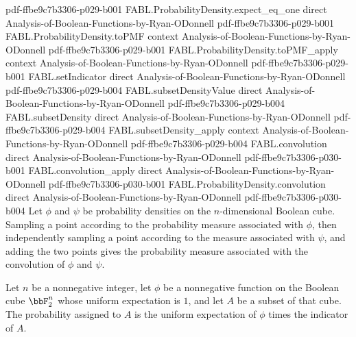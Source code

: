 \begin{theorem}
  {pdf-ffbe9c7b3306-p029-b001}
\proofstep
  {FABL.ProbabilityDensity.expect_eq_one}
  {direct}
  {Analysis-of-Boolean-Functions-by-Ryan-ODonnell}
  {pdf-ffbe9c7b3306-p029-b001}
\proofstep
  {FABL.ProbabilityDensity.toPMF}
  {context}
  {Analysis-of-Boolean-Functions-by-Ryan-ODonnell}
  {pdf-ffbe9c7b3306-p029-b001}
\proofstep
  {FABL.ProbabilityDensity.toPMF_apply}
  {context}
  {Analysis-of-Boolean-Functions-by-Ryan-ODonnell}
  {pdf-ffbe9c7b3306-p029-b001}
\proofstep
  {FABL.setIndicator}
  {direct}
  {Analysis-of-Boolean-Functions-by-Ryan-ODonnell}
  {pdf-ffbe9c7b3306-p029-b004}
\proofstep
  {FABL.subsetDensityValue}
  {direct}
  {Analysis-of-Boolean-Functions-by-Ryan-ODonnell}
  {pdf-ffbe9c7b3306-p029-b004}
\proofstep
  {FABL.subsetDensity}
  {direct}
  {Analysis-of-Boolean-Functions-by-Ryan-ODonnell}
  {pdf-ffbe9c7b3306-p029-b004}
\proofstep
  {FABL.subsetDensity_apply}
  {context}
  {Analysis-of-Boolean-Functions-by-Ryan-ODonnell}
  {pdf-ffbe9c7b3306-p029-b004}
\proofstep
  {FABL.convolution}
  {direct}
  {Analysis-of-Boolean-Functions-by-Ryan-ODonnell}
  {pdf-ffbe9c7b3306-p030-b001}
\proofstep
  {FABL.convolution_apply}
  {direct}
  {Analysis-of-Boolean-Functions-by-Ryan-ODonnell}
  {pdf-ffbe9c7b3306-p030-b001}
\proofstep
  {FABL.ProbabilityDensity.convolution}
  {direct}
  {Analysis-of-Boolean-Functions-by-Ryan-ODonnell}
  {pdf-ffbe9c7b3306-p030-b004}
Let $\phi$ and $\psi$ be probability densities on the $n$-dimensional Boolean cube.
Sampling a point according to the probability measure associated with $\phi$, then
independently sampling a point according to the measure associated with $\psi$, and
adding the two points gives the probability measure associated with the convolution of
$\phi$ and $\psi$.
\end{theorem}

\begin{definition}
\label{FABL.ProbabilityDensity.probability}
\leanok
{}
Let $n$ be a nonnegative integer, let $\phi$ be a nonnegative function on the Boolean
cube $\bbF_2^n$ whose uniform expectation is $1$, and let $A$ be a subset of that cube.
The probability assigned to $A$ is the uniform expectation of $\phi$ times the indicator
of $A$.
\end{definition}

